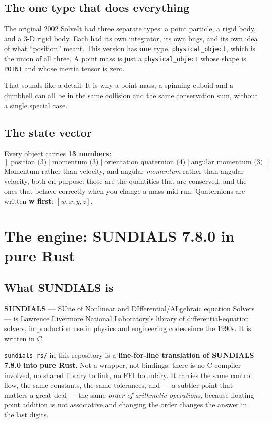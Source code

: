 \documentclass[11pt]{article}
\newcommand{\kw}[1]{\texttt{\uppercase{#1}}}
\newcommand{\code}[1]{\texttt{#1}}
\begin{document}
\subsection{The one type that does everything}

The original 2002 SolveIt had three separate types: a point particle, a
rigid body, and a 3-D rigid body. Each had its own integrator, its own
bugs, and its own idea of what ``position'' meant. This version has
\textbf{one} type, \code{physical\_object}, which is the union of all
three. A point mass is just a \code{physical\_object} whose shape is
\kw{point} and whose inertia tensor is zero.

That sounds like a detail. It is why a point mass, a spinning cuboid and
a dumbbell can all be in the same collision and the same conservation
sum, without a single special case.

\subsection{The state vector}

Every object carries \textbf{13 numbers}:
\[
[\;\text{position (3)}\;|\;\text{momentum (3)}\;|\;
  \text{orientation quaternion (4)}\;|\;\text{angular momentum (3)}\;]
\]
Momentum rather than velocity, and angular \emph{momentum} rather than
angular velocity, both on purpose: those are the quantities that are
conserved, and the ones that behave correctly when you change a mass
mid-run. Quaternions are written \textbf{w first}: $[w,x,y,z]$.

\section{The engine: SUNDIALS 7.8.0 in pure Rust}\label{sec:engine}

\subsection{What SUNDIALS is}

\textbf{SUNDIALS} --- SUite of Nonlinear and DIfferential/ALgebraic
equation Solvers --- is Lawrence Livermore National Laboratory's library
of differential-equation solvers, in production use in physics and
engineering codes since the 1990s. It is written in C.

\code{sundials\_rs/} in this repository is a \textbf{line-for-line
translation of SUNDIALS 7.8.0 into pure Rust}. Not a wrapper, not
bindings: there is no C compiler involved, no shared library to link, no
FFI boundary. It carries the same control flow, the same constants, the
same tolerances, and --- a subtler point that matters a great deal ---
the same \emph{order of arithmetic operations}, because floating-point
addition is not associative and changing the order changes the answer in
the last digits.
\end{document}
